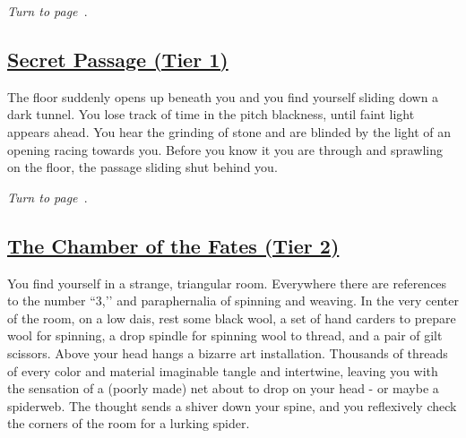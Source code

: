 \documentclass[sheet]{GL2020}
\begin{document}
\vspace{0.5cm}

\emph{Turn to page~\pageref{MeadowofBlackCrocuses}}.

\clearpage

\begin{center}\section*{\underline{Secret Passage (Tier 1)}}\end{center}
\label{SecretPassage}

The floor suddenly opens up beneath you and you find yourself sliding down a dark tunnel. You lose track of time in the pitch blackness, until faint light appears ahead. You hear the grinding of stone and are blinded by the light of an opening racing towards you. Before you know it you are through and sprawling on the floor, the passage sliding shut behind you.

\vspace{0.5cm}

\emph{Turn to page~\pageref{NewPhilosophy}}.

\clearpage

\begin{center}\section*{\underline{The Chamber of the Fates (Tier 2)}}\end{center}
\label{ChamberoftheFates}

You find yourself in a strange, triangular room. Everywhere there are references to the number ``3,’’ and paraphernalia of spinning and weaving. In the very center of the room, on a low dais, rest some black wool, a set of hand carders to prepare wool for spinning, a drop spindle for spinning wool to thread, and a pair of gilt scissors. Above your head hangs a bizarre art installation. Thousands of threads of every color and material imaginable tangle and intertwine, leaving you with the sensation of a (poorly made) net about to drop on your head - or maybe a spiderweb. The thought sends a shiver down your spine, and you reflexively check the corners of the room for a lurking spider.

\vspace{0.5cm}
\end{document}
